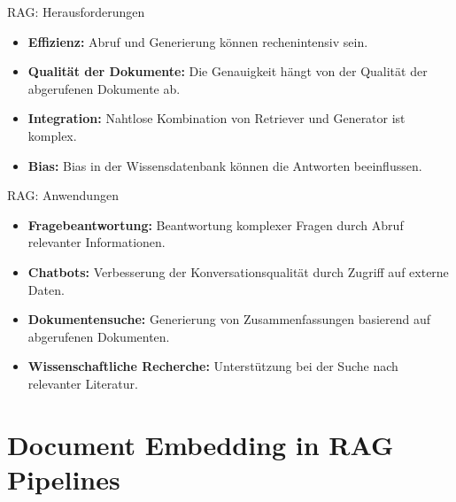 \documentclass[aspectratio=1610, xcolor=dvipsnames, 9pt]{beamer}
\begin{document}
\begin{frame}{RAG: Herausforderungen}
  \begin{itemize}
    \item \textbf{Effizienz:} Abruf und Generierung können rechenintensiv sein. \\
    \item \textbf{Qualität der Dokumente:} Die Genauigkeit hängt von der Qualität der abgerufenen Dokumente ab. \\
    \item \textbf{Integration:} Nahtlose Kombination von Retriever und Generator ist komplex. \\
    \item \textbf{Bias:} Bias in der Wissensdatenbank können die Antworten beeinflussen.
  \end{itemize}
\end{frame}

\begin{frame}{RAG: Anwendungen}
  \begin{itemize}
    \item \textbf{Fragebeantwortung:} Beantwortung komplexer Fragen durch Abruf relevanter Informationen. \\
    \item \textbf{Chatbots:} Verbesserung der Konversationsqualität durch Zugriff auf externe Daten. \\
    \item \textbf{Dokumentensuche:} Generierung von Zusammenfassungen basierend auf abgerufenen Dokumenten. \\
    \item \textbf{Wissenschaftliche Recherche:} Unterstützung bei der Suche nach relevanter Literatur.
  \end{itemize}
\end{frame}

\section{Document Embedding in RAG Pipelines}
\end{document}
